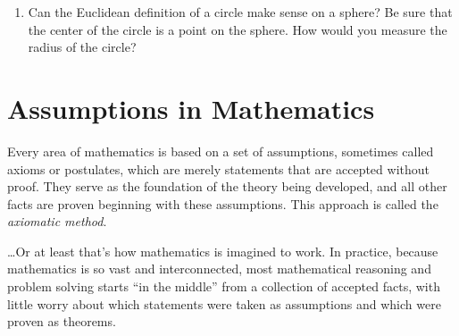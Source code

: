 \begin{problems}
\begin{enumerate}
\item Can the Euclidean definition of a circle make sense on a sphere?  Be sure that the center of the circle is a point on the sphere.  How would you measure the radius of the circle?  









\end{enumerate}

\end{problems}

\newpage 

\section{Assumptions in Mathematics}
Every area of mathematics is based on a set of assumptions, sometimes called axioms or postulates,
which are merely statements that are accepted without proof.  They serve as the foundation of the theory being developed, and all other facts are proven beginning with these assumptions.  This approach is called the \emph{axiomatic method}.  

\dots Or at least that's how mathematics is imagined to work.  In practice, because mathematics is so vast and interconnected, most mathematical reasoning and problem solving starts ``in the middle'' from a collection of accepted facts, with little worry about which statements were taken as assumptions and which were proven as theorems.  

